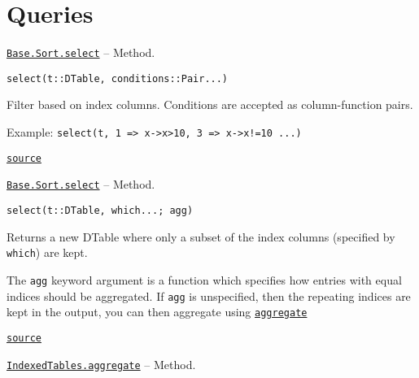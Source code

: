 \documentclass{memoir}
\begin{document}
\hypertarget{1042524252901497207}{}


\section{Queries}


\hypertarget{15191396688178857700}{} 
\hyperlink{15191396688178857700}{\texttt{Base.Sort.select}}  -- {Method.}

\begin{adjustwidth}{2em}{0pt}


\begin{lstlisting}
select(t::DTable, conditions::Pair...)
\end{lstlisting}

Filter based on index columns. Conditions are accepted as column-function pairs.

Example: \texttt{select(t, 1 => x->x>10, 3 => x->x!=10 ...)}



\href{https://github.com/JuliaComputing/JuliaDB.jl/tree/9e65f8c3b0e9c2e27c3334a093a5aefc6c7d1246/src/query.jl#L6-L12}{\texttt{source}}


\end{adjustwidth}
\hypertarget{3568968303749712889}{} 
\hyperlink{3568968303749712889}{\texttt{Base.Sort.select}}  -- {Method.}

\begin{adjustwidth}{2em}{0pt}


\begin{lstlisting}
select(t::DTable, which...; agg)
\end{lstlisting}

Returns a new DTable where only a subset of the index columns (specified by \texttt{which}) are kept.

The \texttt{agg} keyword argument is a function which specifies how entries with equal indices should be aggregated. If \texttt{agg} is unspecified, then the repeating indices are kept in the output, you can then aggregate using \href{apireference.html\#IndexedTables.aggregate-Tuple\{Any,JuliaDB.DTable\}}{\texttt{aggregate}}



\href{https://github.com/JuliaComputing/JuliaDB.jl/tree/9e65f8c3b0e9c2e27c3334a093a5aefc6c7d1246/src/query.jl#L17-L25}{\texttt{source}}


\end{adjustwidth}
\hypertarget{3546161945843634442}{} 
\hyperlink{3546161945843634442}{\texttt{IndexedTables.aggregate}}  -- {Method.}
\end{document}
